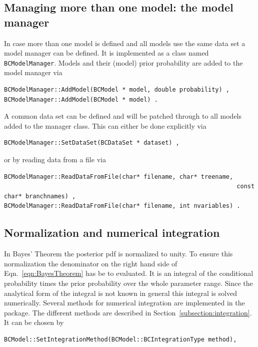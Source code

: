 \documentclass[11pt, a4paper]{article}
\begin{document}
\subsection{Managing more than one model: the model manager} 
\label{subsection:modelmanager}

In case more than one model is defined and all models use the same
data set a model manager can be defined. It is implemented as a class
named \verb|BCModelManager|. Models and their (model) prior
probability are added to the model manager via
% 
\begin{verbatim}
BCModelManager::AddModel(BCModel * model, double probability) , 
BCModelManager::AddModel(BCModel * model) .
\end{verbatim} 

\noindent 
A common data set can be defined and will be patched through to all
models added to the manager class. This can either be done explicitly
via
%
\begin{verbatim}
BCModelManager::SetDataSet(BCDataSet * dataset) , 
\end{verbatim} 

\noindent 
or by reading data from a file via 
%
\begin{verbatim}
BCModelManager::ReadDataFromFile(char* filename, char* treename, 
																 const char* branchnames) , 
BCModelManager::ReadDataFromFile(char* filename, int nvariables) . 
\end{verbatim} 


\subsection{Normalization and numerical integration} 
\label{section:normalization} 

In Bayes' Theorem the posterior pdf is normalized to unity. To ensure
this normalization the denominator on the right hand side of
Eqn.~\ref{eqn:BayesTheorem} has be to evaluated. It is an integral of
the conditional probability times the prior probability over the whole
parameter range. Since the analytical form of the integral is not
known in general this integral is solved numerically. Several methods
for numerical integration are implemented in the package. The
different methods are described in
Section~\ref{subsection:integration}. It can be chosen by
%
\begin{verbatim}
BCModel::SetIntegrationMethod(BCModel::BCIntegrationType method), 
\end{verbatim} 
\end{document}
